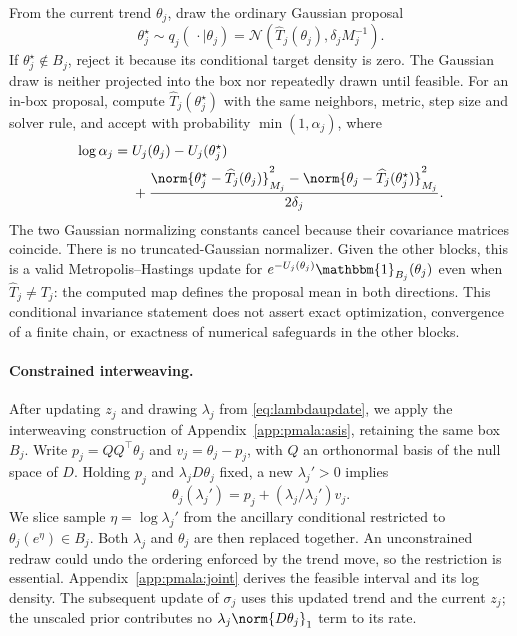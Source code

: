 From the current trend $\theta_j$, draw the ordinary Gaussian proposal
\begin{equation}
    \theta_j^\star\sim q_j(\,\cdot\mid\theta_j)
    =\mathcal N\!\left(\widehat T_j(\theta_j),\delta_jM_j^{-1}\right).
    \label{eq:joint_proposal}
\end{equation}
If $\theta_j^\star\notin B_j$, reject it because its conditional target density is zero. The Gaussian draw is neither projected into the box nor repeatedly drawn until feasible. For an in-box proposal, compute $\widehat T_j(\theta_j^\star)$ with the same neighbors, metric, step size and solver rule, and accept with probability $\min(1,\alpha_j)$, where
\begin{equation}
\begin{aligned}
    \log\alpha_j ={}& U_j(\theta_j)-U_j(\theta_j^\star)\\
    &+\frac{\norm{\theta_j^\star-\widehat T_j(\theta_j)}_{M_j}^2
            -\norm{\theta_j-\widehat T_j(\theta_j^\star)}_{M_j}^2}{2\delta_j}.
\end{aligned}
    \label{eq:joint_accept}
\end{equation}
The two Gaussian normalizing constants cancel because their covariance matrices coincide. There is no truncated-Gaussian normalizer. Given the other blocks, this is a valid Metropolis--Hastings update for $e^{-U_j(\theta_j)}\mathbbm{1}_{B_j}(\theta_j)$ even when $\widehat T_j\ne T_j$: the computed map defines the proposal mean in both directions. This conditional invariance statement does not assert exact optimization, convergence of a finite chain, or exactness of numerical safeguards in the other blocks.

\paragraph{Constrained interweaving.} After updating $z_j$ and drawing $\lambda_j$ from \eqref{eq:lambdaupdate}, we apply the interweaving construction of Appendix~\ref{app:pmala:asis}, retaining the same box $B_j$. Write $p_j=QQ^\top\theta_j$ and $v_j=\theta_j-p_j$, with $Q$ an orthonormal basis of the null space of $D$. Holding $p_j$ and $\lambda_jD\theta_j$ fixed, a new $\lambda_j'>0$ implies
\begin{equation}
    \theta_j(\lambda_j')=p_j+(\lambda_j/\lambda_j')v_j.
    \label{eq:joint_asis_curve}
\end{equation}
We slice sample $\eta=\log\lambda_j'$ from the ancillary conditional restricted to $\theta_j(e^\eta)\in B_j$. Both $\lambda_j$ and $\theta_j$ are then replaced together. An unconstrained redraw could undo the ordering enforced by the trend move, so the restriction is essential. Appendix~\ref{app:pmala:joint} derives the feasible interval and its log density. The subsequent update of $\sigma_j$ uses this updated trend and the current $z_j$; the unscaled prior contributes no $\lambda_j\norm{D\theta_j}_1$ term to its rate.

